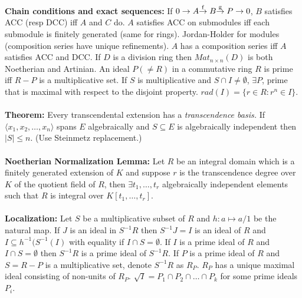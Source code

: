 {\bf Chain conditions and exact sequences:}
If $0 \rightarrow A
{\buildrel\rm f\over \rightarrow} \; B {\buildrel\rm g\over \rightarrow} \; 
P \rightarrow 0$, $B$ satisfies ACC (resp DCC) iff $A$ and $C$ do.
$A$ satisfies ACC on submodules iff each submodule is finitely generated (same for
rings).  Jordan-Holder for modules (composition series have unique refinements).  $A$
has a composition series iff $A$ satisfies ACC and DCC.  If $D$ is a division ring
then $Mat_{n \times n}(D)$ is both Noetherian and Artinian.  An ideal $P (\ne R)$
in a commutative ring $R$ is prime iff $R-P$ is a multiplicative set.  If
$S$ is multiplicative and $S \cap I \ne \emptyset$, $\exists P$, prime that is maximal
with respect to the disjoint property.  $rad(I)= \{ r \in R: r^n \in I \}$.
\\
\\
{\bf Theorem:}
Every transcendental extension has a \emph{transcendence basis.}
If $\langle x_1, x_2, \ldots , x_n \rangle$
spans $E$ algebraically and $S \subseteq E$ is algebraically independent then
$|S| \le n$. (Use Steinmetz replacement.) 
\\
\\
{\bf Noetherian Normalization Lemma:}
Let $R$ be an integral domain which is a finitely generated extension of $K$ and
suppose $r$ is the transcendence degree over $K$ of the quotient field of $R$, then
$\exists t_1, \ldots, t_r$ algebraically independent elements such that
$R$ is integral over $K[t_1, \ldots, t_r]$.
\\
\\
{\bf Localization:} Let $S$ be a multiplicative subset of $R$ and $h: a \mapsto a/1$ 
be the natural map.  If $J$ is an ideal in $S^{-1}R$ then
$S^{-1}J = I$ is an ideal of $R$ and
$I \subseteq h^{-1}(S^{-1}(I)$ with equality if $I \cap S = \emptyset$.
If $I$ is a prime ideal of $R$ and $I \cap S= \emptyset$ then $S^{-1}R$ is a
prime ideal of $S^{-1}R$.  If $P$ is a prime ideal of $R$ and $S=R-P$ is a
multiplicative set, denote $S^{-1}R$ as $R_P$.  $R_P$ has a unique maximal ideal
consisting of non-units of $R_P$.  ${\sqrt I}= P_1 \cap P_2 \cap \ldots \cap P_k$ for
some prime ideals $P_i$.
